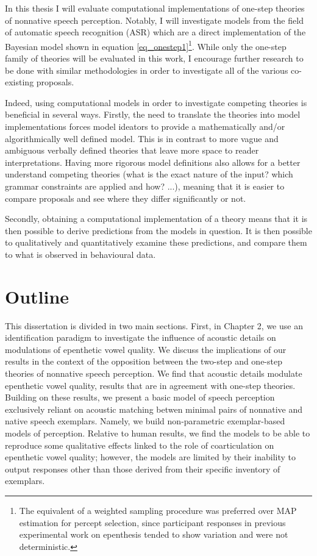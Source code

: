 In this thesis I will evaluate computational implementations of one-step theories of nonnative speech perception. Notably, I will investigate models from the field of automatic speech recognition (ASR) which are a direct implementation of the Bayesian model shown in equation \ref{eq_onestep1}\footnote{The equivalent of a weighted sampling procedure was preferred over MAP estimation for percept selection, since participant responses in previous experimental work on epenthesis tended to show variation and were not deterministic.}. 
While only the one-step family of theories will be evaluated in this work, I encourage further research to be done with similar methodologies in order to investigate all of the various co-existing proposals.

Indeed, using computational models in order to investigate competing theories is beneficial in several ways. Firstly, the need to translate the theories into model implementations forces model ideators to provide a mathematically and/or algorithmically well defined model. This is in contrast to more vague and ambiguous verbally defined theories that leave more space to reader interpretations. Having more rigorous model definitions also allows for a better understand competing theories (what is the exact nature of the input? which grammar constraints are applied and how? ...), meaning that it is easier to compare proposals and see where they differ significantly or not. 

Secondly, obtaining a computational implementation of a theory means that it is then possible to derive predictions from the models in question. It is then possible to qualitatively and quantitatively examine these predictions, and compare them to what is observed in behavioural data.

\section{Outline}

This dissertation is divided in two main sections. First, in Chapter 2, we use an identification paradigm to investigate the influence of acoustic details on modulations of epenthetic vowel quality. We discuss the implications of our results in the context of the opposition between the two-step and one-step theories of nonnative speech perception. We find that acoustic details modulate epenthetic vowel quality, results that are in agreement with one-step theories. Building on these results, we present a basic model of speech perception exclusively reliant on acoustic matching betwen minimal pairs of nonnative and native speech exemplars. Namely, we build non-parametric exemplar-based models of perception. Relative to human results, we find the models to be able to reproduce some qualitative effects linked to the role of coarticulation on epenthetic vowel quality; however, the models are limited by their inability to output responses other than those derived from their specific inventory of exemplars.

